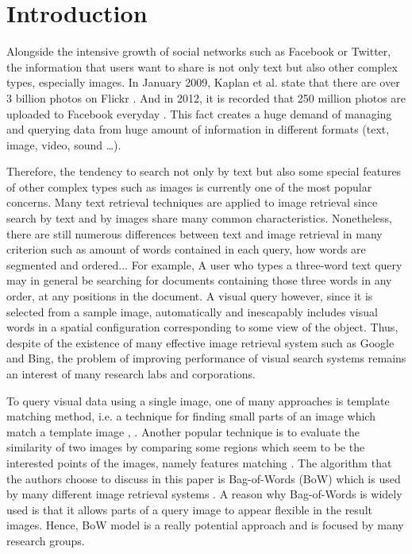 % 

\section{Introduction} \label{section:introduction}
Alongside the intensive growth of social networks such as Facebook or Twitter, the information that users want to share is not only text but also other complex types, especially images. In January 2009, Kaplan et al. state that there are over 3 billion photos on Flickr \cite{Kaplan201059}. And in 2012, it is recorded that 250 million photos are uploaded to Facebook everyday \cite{1}. This fact creates a huge demand of managing and querying data from huge amount of information in different formats (text, image, video, sound \ldots).

Therefore, the tendency to search not only by text but also some special features of other complex types such as images is currently one of the most popular concerns. Many text retrieval techniques are applied to image retrieval since search by text and by images share many common characteristics. Nonetheless, there are still numerous differences between text and image retrieval in many criterion such as amount of words contained in each query, how words are segmented and ordered... For example, A user who types a three-word text query may in general be searching for documents containing those three words in any order, at any positions in the document. A visual query however, since it is selected
from a sample image, automatically and inescapably includes visual words in a spatial configuration corresponding to some view of the object. Thus, despite of the existence of many effective image retrieval system such as Google and Bing, the problem of improving performance of visual search systems remains an interest of many research labs and corporations.

To query visual data using a single image, one of many approaches is template matching method, i.e. a technique for finding small parts of an image which match a template image \cite{brunelli_template_matching}, \cite{Rosenfeld4309663, Gharavi913587}. Another popular technique is to evaluate the similarity of two images by comparing some regions which seem to be the interested points of the images, namely features matching \cite{Belongie710790, Rubner, Viola990517}. The algorithm that the authors choose to discuss in this paper is Bag-of-Words (BoW) \cite{3} which is used by many different image retrieval systems \cite{3, 2, 7}. A reason why Bag-of-Words is widely used is that it allows parts of a query image to appear flexible in the result images. Hence, BoW model is a really potential approach and is focused by many research groups.

